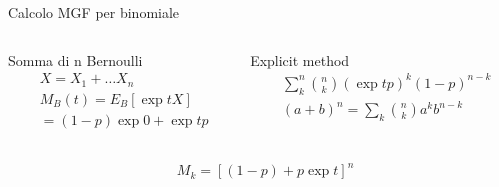 \documentclass[asd-beamer.tex]{subfiles}%
\begin{document}
\begin{wordonframe}{Calcolo MGF per binomiale}
\begin{columns}[T]
\begin{column}{0.5\textwidth}
\begin{block}{Somma di n Bernoulli}
\begin{align*}
&X=X_1+\ldots X_n\\
&M_B(t)=E_B[\exp{tX}]\\
&=(1-p)\exp{0}+\exp{t}p
\end{align*}
\end{block}
\end{column}
\begin{column}{0.5\textwidth}
\begin{block}{Explicit method}
\begin{align*}
&\sum_k^n\binom{n}{k}(\exp{t}p)^k(1-p)^{n-k}\\
&(a+b)^n=\sum_k\binom{n}{k}a^kb^{n-k}
\end{align*}
\end{block}
\end{column}
\end{columns}
\begin{align*}
&M_k=[(1-p)+p\exp{t}]^n
\end{align*}
\end{wordonframe}
\end{document}
